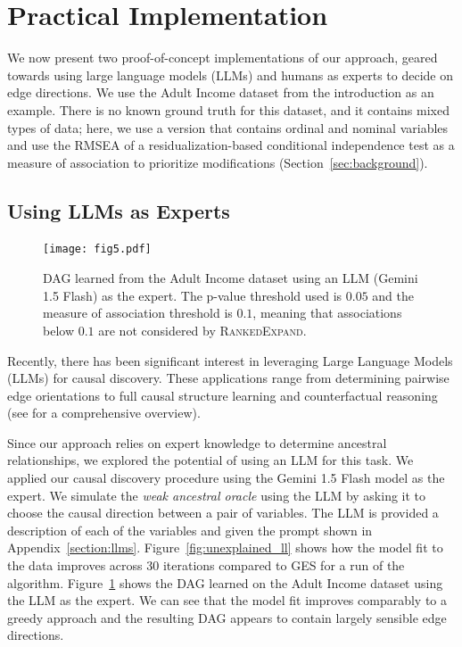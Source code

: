 \documentclass{uai2025} %
\begin{document}
\section{Practical Implementation}

\label{sec:web}

We now present two proof-of-concept implementations of our approach, 
geared towards using  large language models (LLMs) and humans as experts
to decide on edge directions. We use the Adult Income dataset from the 
introduction as an example. There is no known ground truth for this dataset,
and it contains mixed types of data; here, we use a version that contains
ordinal and nominal variables and use the RMSEA of a residualization-based
conditional independence test \citep{Ankan2023} as a measure of association
to prioritize modifications (Section~\ref{sec:background}). 

\subsection{Using LLMs as Experts}
 
\begin{figure}[t!]
	\centering
	\texttt{[image: fig5.pdf]}
	\caption{DAG learned from the Adult Income dataset using an LLM
		(Gemini 1.5 Flash) as the expert. The p-value threshold used is $ 0.05 $ 
		and the measure of association threshold is $ 0. 1 $, meaning
		that associations below $0.1$ are not considered by 
		\textsc{RankedExpand}.}
	\label{fig:adult_llm}
\end{figure}

Recently, there has been significant interest in leveraging Large Language
Models (LLMs) for causal discovery. These applications range from determining
pairwise edge orientations \citep{Kiciman2023, Jin2024} to full causal
structure learning \citep{Naik2023, Vashishtha2023} and counterfactual
reasoning \citep{Kiciman2023} (see \citet{Liu2024} for a comprehensive
overview).

Since our approach relies on expert knowledge to determine ancestral relationships,
we explored the potential of using an LLM for this task. We applied our causal
discovery procedure using the Gemini 1.5 Flash model as the expert. We simulate
the \emph{weak ancestral oracle} using the LLM by asking it to choose the
causal direction between a pair of variables. The LLM is provided a description
of each of the variables and given the prompt shown in
Appendix~\ref{section:llms}. 
Figure~\ref{fig:unexplained_ll} shows how the model fit to the data improves 
across 30 iterations compared to GES for a run of the algorithm.
Figure~\ref{fig:adult_llm} shows the DAG learned
on the Adult Income dataset using the LLM as the expert. We can see 
that the model fit improves comparably to a greedy approach and 
the resulting DAG appears to contain largely sensible edge directions. 
\end{document}
